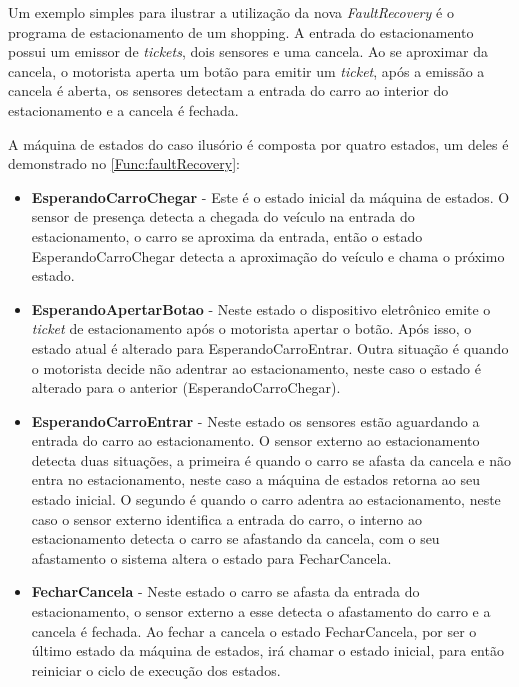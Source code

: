 Um exemplo simples para ilustrar a utilização da nova \textit{FaultRecovery} é o programa de estacionamento de um shopping. A entrada do estacionamento possui um emissor de \textit{tickets}, dois sensores e uma cancela. Ao se aproximar da cancela, o motorista aperta um botão para emitir um \textit{ticket}, após a emissão a cancela é aberta, os sensores detectam a entrada do carro ao interior do estacionamento e a cancela é fechada.

A máquina de estados do caso ilusório é composta por quatro estados, um deles é demonstrado no \autoref{Func:faultRecovery}:

\begin{itemize}
	\item \textbf{EsperandoCarroChegar} - Este é o estado inicial da máquina de estados. O sensor de presença detecta a chegada do veículo na entrada do estacionamento, o carro se aproxima da entrada, então o estado EsperandoCarroChegar detecta a aproximação do veículo e chama o próximo estado.
	
	\item \textbf{EsperandoApertarBotao} - Neste estado o dispositivo eletrônico emite o \textit{ticket} de estacionamento após o motorista apertar o botão. Após isso, o estado atual é alterado para EsperandoCarroEntrar. Outra situação é quando o motorista decide não adentrar ao estacionamento, neste caso o estado é alterado para o anterior (EsperandoCarroChegar). 
	
	\item \textbf{EsperandoCarroEntrar} - Neste estado os sensores estão aguardando a entrada do carro ao estacionamento. O sensor externo ao estacionamento detecta duas situações, a primeira é quando o carro se afasta da cancela e não entra no estacionamento, neste caso a máquina de estados retorna ao seu estado inicial. O segundo é quando o carro adentra ao estacionamento, neste caso o sensor externo identifica a entrada do carro, o interno ao estacionamento detecta o carro se afastando da cancela, com o seu afastamento o sistema altera o estado para FecharCancela.
	
	\item \textbf{FecharCancela} - Neste estado o carro se afasta da entrada do estacionamento, o sensor externo a esse detecta o afastamento do carro e a cancela é fechada. Ao fechar a cancela o estado FecharCancela, por ser o último estado da máquina de estados, irá chamar o estado inicial, para então reiniciar o ciclo de execução dos estados.
	
\end{itemize}


